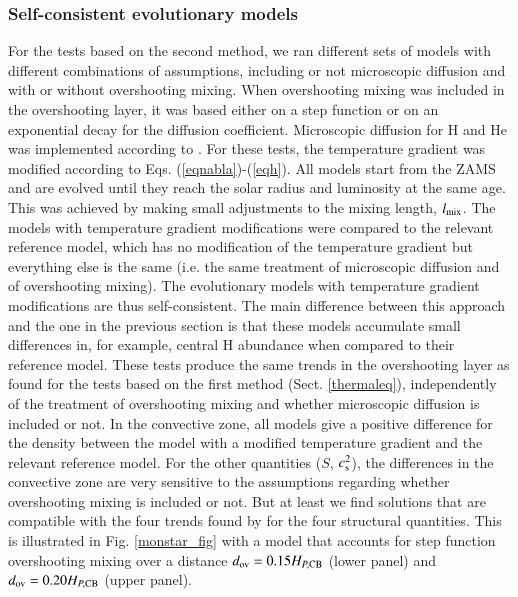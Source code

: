 \documentclass[traditabstract]{aa}
\newcommand{\3}{\ss}
\newcommand{\cp}{\citep}
\newcommand{\ct}{\citet}
\begin{document}
{\subsubsection{Self-consistent evolutionary models}
\label{self}

For the tests based on the second method, 
 we ran different sets of models with different combinations of assumptions, including or not microscopic diffusion and with or without overshooting mixing. 
When overshooting mixing was included in the overshooting layer, it was based either on a step function  or on an exponential decay for the diffusion coefficient. Microscopic diffusion for H and He was implemented according to \ct{thoul94}. For these tests, the temperature gradient was modified  according to { Eqs. (\ref{eqnabla})-(\ref{eqh})}. All models start from the ZAMS and are evolved until they reach the solar radius and luminosity at the same age. This was achieved by making small adjustments to the mixing length,  $l_{\rm mix}$. The models with temperature gradient modifications were compared to the relevant reference model, which has no modification of the temperature gradient but everything else is the same (i.e. the same treatment of microscopic diffusion and of overshooting mixing).  
The evolutionary models with temperature gradient modifications are thus self-consistent.
The main difference between this approach and the one in the previous section is  that these models accumulate small
differences in, for example, central H abundance when compared to their reference model. These tests produce the same trends  in the overshooting layer as found for the tests based on the first method (Sect. \ref{thermaleq}), independently of the treatment of overshooting mixing and whether microscopic diffusion is included or not. In the convective zone, all models give a positive difference for the density  between the model with a modified temperature gradient and the relevant reference model.
For the other quantities ($S$, $c_{\rm s}^2$), the differences in the convective zone are very sensitive to the assumptions regarding whether overshooting mixing is included or not. But at least we find solutions that are compatible with the four trends found by \ct{buldgen20} for the four structural quantities. This is illustrated in  Fig. \ref{monstar_fig} with a model that accounts for step function overshooting mixing  over a distance $d_{\rm ov} = 0.15 H_{P,{\rm CB}}$ (lower panel) and $d_{\rm ov} = 0.20 H_{P,{\rm CB}}$ (upper panel).
 
}
\end{document}
